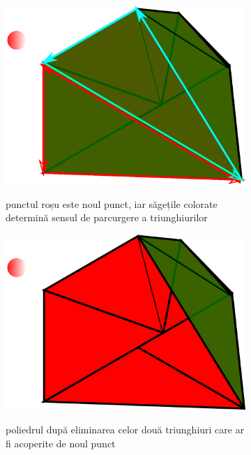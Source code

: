 \documentclass[12pt,a4paper]{report}
\begin{document}
	\begin{figure}[H]
		\centering
		\begin{subfigure}[h]{0.32\textwidth}
			\includegraphics[width=\textwidth]{pics/EPA0.png}
			\label{fig:EPA0}
			\caption{punctul roșu este noul punct, iar săgețile colorate determină sensul de parcurgere a triunghiurilor}
			\vfill
		\end{subfigure}
		\hfill
		\begin{subfigure}[h]{0.32\textwidth}
			\includegraphics[width=\textwidth]{pics/EPA1.png}
			\label{fig:EPA1}
			\caption{poliedrul după eliminarea celor două triunghiuri care ar fi acoperite de noul punct}
			\vfill
		\end{subfigure}
		\hfill
		\begin{subfigure}[h]{0.32\textwidth}

\end{subfigure}
\end{figure}
\end{document}
